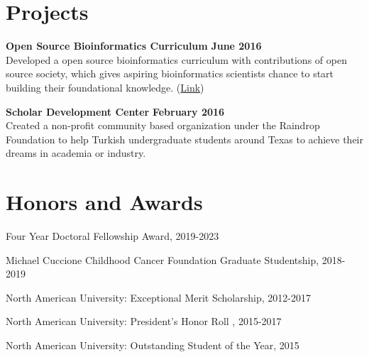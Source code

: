 \documentclass[margin,line]{res}
\begin{document}
\begin{resume}
\section{\sc Projects}


{\bf Open Source Bioinformatics Curriculum} \hfill {\bf June  2016}\\
Developed a open source bioinformatics curriculum with contributions of open source society, which gives aspiring bioinformatics scientists chance to start building their foundational knowledge. (\href{https://github.com/open-source-society/bioinformatics}{Link})

{\bf Scholar Development Center} \hfill {\bf February  2016}\\
Created a non-profit community based organization under the Raindrop Foundation to help Turkish undergraduate students around Texas to achieve their dreams in academia or industry.

\vspace{\baselineskip}

\section{\sc Honors and Awards}

Four Year Doctoral Fellowship Award, 2019-2023

\vspace*{-2.5mm}

Michael Cuccione Childhood Cancer Foundation Graduate Studentship, 2018-2019

\vspace*{-2.5mm}
North American University: Exceptional Merit Scholarship, 2012-2017

\vspace*{-2.5mm}
North American University: President's Honor Roll , 2015-2017

\vspace*{-2.5mm}
North American University: Outstanding Student of the Year, 2015



\end{resume}
\end{document}
